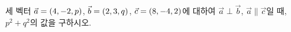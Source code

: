 세 벡터 $\vec{a}=(4{,}\mkern3mu\mathopen{}-2{,}\mkern3mu\mathopen{}p)$, $\vec{b}=(2{,}\mkern3mu\mathopen{}3{,}\mkern3mu\mathopen{}q)$, $\vec{c}=(8{,}\mkern3mu\mathopen{}-4{,}\mkern3mu\mathopen{}2)$에 대하여 $\vec{a}\perp\vec{b}$, $\vec{a}\parallel\vec{c}$일 때, $p^2+q^2$의 값을 구하시오.
